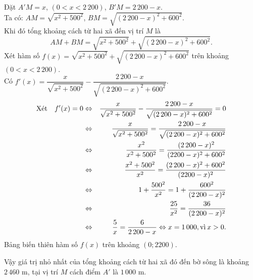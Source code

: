 \begin{ex}
{\begin{center}
		\end{center}
		Đặt $A'M=x$, $(0<x<2\,200)$,  $B'M=2\,200-x$.\\
		Ta có: $AM=\sqrt{x^2+500^2}$, $BM=\sqrt{(2\,200-x)^2+600^2}$.\\
		Khi đó tổng khoảng cách từ hai xã đến vị trí $M$ là
		\[AM+BM= \sqrt{x^2+500^2}+\sqrt{(2\,200-x)^2+600^2}.\]
		Xét hàm số $f(x)= \sqrt{x^2+500^2}+\sqrt{(2\,200-x)^2+600^2}$ trên khoảng $(0<x<2\,200)$.\\ 
		Có $f'(x)=\dfrac{x}{\sqrt{x^2+500^2}}-\dfrac{2\,200-x}{\sqrt{(2\,200-x)^2+600^2}}$.
		\begin{eqnarray*}
			\text{Xét}\quad	f'(x)=0&\Leftrightarrow & \dfrac{x}{\sqrt{x^2+500^2}}-\dfrac{2\,200-x}{\sqrt{(2\,200-x)^2+600^2}}=0\\
			&\Leftrightarrow & \dfrac{x}{\sqrt{x^2+500^2}}=\dfrac{2\,200-x}{\sqrt{(2\,200-x)^2+600^2}}\\
			&\Leftrightarrow & \dfrac{x^2}{x^2+500^2}=\dfrac{(2\,200-x)^2}{(2200-x)^2+600^2}\\
			&\Leftrightarrow &\dfrac{x^2+500^2}{x^2}=\dfrac{(2\,200-x)^2+600^2}{(2200-x)^2}\\
			&\Leftrightarrow &	1+\dfrac{500^2}{x^2}=1+\dfrac{600^2}{(2\,200-x)^2}\\
			&\Leftrightarrow &	\dfrac{25}{x^2}=\dfrac{36}{(2\,200-x)^2}\\
			&\Leftrightarrow &\dfrac{5}{x}=\dfrac{6}{2\,200-x} \Leftrightarrow x=1\,000,  \text{vì}\hspace{.2em} x>0.
		\end{eqnarray*}
		Bảng biến thiên hàm số $f(x)$ trên khoảng $\left( 0;2200\right)$.
		\begin{center}
		\end{center}
		Vậy giá trị nhỏ nhất của tổng khoảng cách từ hai xã đó đến bờ sông  là khoảng $2\,460 \text{ m}$, tại vị trí $M$ cách điểm $A'$  là $1\,000 \text{ m}$.
	}
\end{ex}

